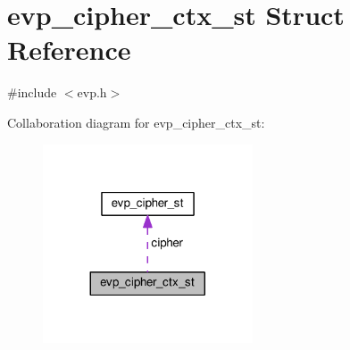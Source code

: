 \hypertarget{structevp__cipher__ctx__st}{}\section{evp\+\_\+cipher\+\_\+ctx\+\_\+st Struct Reference}
\label{structevp__cipher__ctx__st}


{\ttfamily \#include $<$evp.\+h$>$}



Collaboration diagram for evp\+\_\+cipher\+\_\+ctx\+\_\+st\+:
\nopagebreak
\begin{figure}[H]
\begin{center}
\leavevmode
\includegraphics[width=176pt]{structevp__cipher__ctx__st__coll__graph}
\end{center}
\end{figure}
